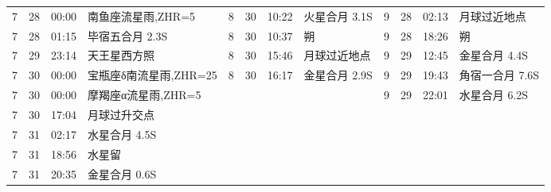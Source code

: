 \begin{tabular}{llll|llll|llll}
7 & 28 & 00:00 & 南鱼座流星雨,ZHR=5 & 8 & 30 & 10:22 & 火星合月 3.1S & 9 & 28 & 02:13 & 月球过近地点 \tabularnewline
7 & 28 & 01:15 & 毕宿五合月 2.3S & 8 & 30 & 10:37 & 朔 & 9 & 28 & 18:26 & 朔 \tabularnewline
7 & 29 & 23:14 & 天王星西方照 & 8 & 30 & 15:46 & 月球过近地点 & 9 & 29 & 12:45 & 金星合月 4.4S \tabularnewline
7 & 30 & 00:00 & 宝瓶座δ南流星雨,ZHR=25 & 8 & 30 & 16:17 & 金星合月 2.9S & 9 & 29 & 19:43 & 角宿一合月 7.6S \tabularnewline
7 & 30 & 00:00 & 摩羯座α流星雨,ZHR=5 &  &  &  &  & 9 & 29 & 22:01 & 水星合月 6.2S \tabularnewline
7 & 30 & 17:04 & 月球过升交点 &  &  &  &  &  &  &  &  \tabularnewline
7 & 31 & 02:17 & 水星合月 4.5S &  &  &  &  &  &  &  &  \tabularnewline
7 & 31 & 18:56 & 水星留 &  &  &  &  &  &  &  &  \tabularnewline
7 & 31 & 20:35 & 金星合月 0.6S &  &  &  &  &  &  &  &  \tabularnewline
\hline \end{tabular}

